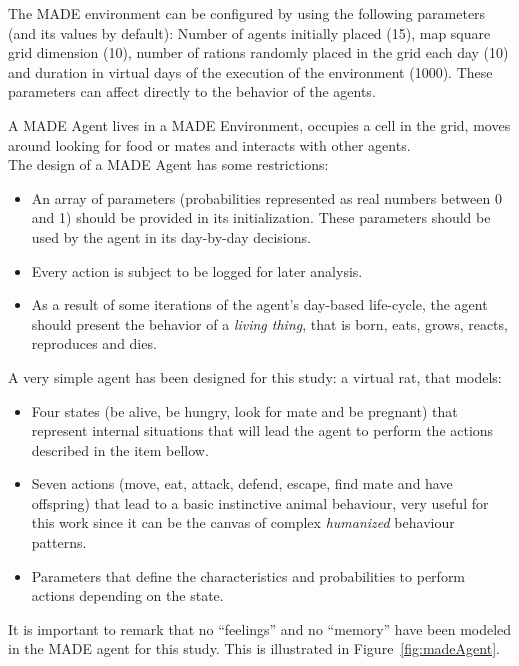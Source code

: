 \documentclass[letterpaper]{article}
\begin{document}
The MADE environment can be configured by using the following parameters (and its values by default): Number of agents initially placed (15), map square grid dimension (10), number of rations randomly placed in the grid each day (10) and duration in virtual days of the  execution of the environment (1000). These parameters can affect directly to the behavior of the agents.


A MADE Agent lives in a MADE Environment, occupies a cell in the grid, moves around looking for food or mates and interacts with other agents.\\


The design of a MADE Agent has some restrictions:
\begin{itemize}
\item An array of parameters (probabilities represented as real numbers between 0 and 1) should be provided in its initialization. These parameters should be used by the agent in its day-by-day decisions.
\item Every action is subject to be logged for later analysis.
\item As a result of some iterations of the agent's day-based life-cycle, the agent should present the behavior of a \textit{living thing}, that is born, eats, grows, reacts, reproduces and dies.  
\end{itemize}

A very simple agent has been designed for this study: a virtual
rat, that models:
\begin{itemize}
\item Four states (be alive, be hungry, look for
mate and be pregnant) that represent internal situations that will lead the
agent to perform the actions described in the item bellow.
\item Seven actions (move, eat, attack, defend, escape,
find mate and have offspring) that lead to a basic instinctive animal
behaviour, very useful for this work since it can be the canvas of 
complex \textit{humanized} behaviour patterns.
\item Parameters that define the characteristics and probabilities to
perform actions depending on the state.
\end{itemize}
It is important to remark that no ``feelings'' and no ``memory''
have been modeled in the MADE agent for this study. This is
illustrated in Figure~\ref{fig:madeAgent}.
\end{document}
